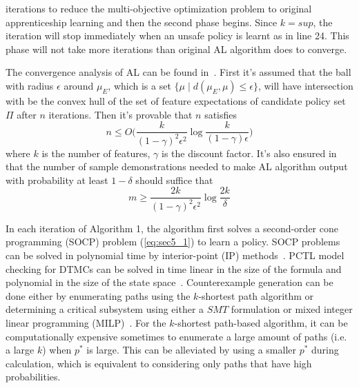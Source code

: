 \noindent iterations to reduce the multi-objective optimization problem to original apprenticeship learning and then the second phase begins. Since $k=sup$, the iteration will stop immediately when an unsafe policy is learnt as in line 24. This phase will not take more iterations than original AL algorithm does to converge.

The convergence analysis of AL can be found in~\cite{Abbeel:2004:ALV:1015330.1015430}. First it's assumed that the ball with radius $\epsilon$ around $\mu_E$, which is a set $\{\mu\mid d(\mu_E, \mu)\leq\epsilon\}$, will have intersection with be the convex hull of the set of feature expectations of candidate policy set $\Pi$ after $n$ iterations. Then it's provable that $n$ satisfies
\begin{equation}
n\leq O\big(\frac{k}{(1-\gamma)^2\epsilon^2}\log{\frac{k}{(1-\gamma)\epsilon}}\big)
\end{equation}
where $k$ is the number of features, $\gamma$ is the discount factor. It's also ensured in~\cite{Abbeel:2004:ALV:1015330.1015430} that the number of sample demonstrations needed to make AL algorithm output with probability at least $1-\delta$ should suffice that
\begin{equation}
m\geq \frac{2k}{(1-\gamma)^2\epsilon^2}\log{\frac{2k}{\delta}}
\end{equation}

In each iteration of Algorithm 1, the algorithm first solves a second-order cone programming (SOCP) problem (\ref{eq:sec5_1}) to learn a policy. SOCP problems can be solved in polynomial time by interior-point (IP) methods~\cite{Kuo:2004aa}.
PCTL model checking for DTMCs can be solved in time linear in the size of the formula and polynomial in the size of the state space~\cite{Hansson1994}. 
Counterexample generation can be done either by enumerating paths using the $k$-shortest path algorithm or determining a critical subsystem using either a $SMT$ formulation or mixed integer linear programming (MILP)~\cite{Wimmer2012}. For the $k$-shortest path-based algorithm, it can be computationally expensive sometimes to enumerate a large amount of paths (i.e. a large $k$) when $p^*$ is large. This can be alleviated by using a smaller $p^*$ during calculation, which is equivalent to considering only paths that have high probabilities.
